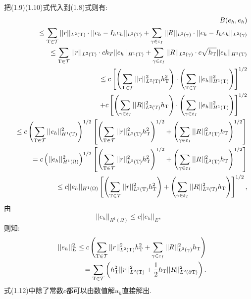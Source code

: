 \documentclass[9pt, a4paper,eqno]{article}
\theoremstyle{plain}
\begin{document}
\begin{CJK}{UTF8}{gkai}
把(1.9)(1.10)式代入到(1.8)式则有:
\begin{eqnarray}
&& B(e_{h},e_{h})
\nonumber\\&& \leq \sum_{ \rm T \in \mathcal{T} } || r|| _{L^{2}(\rm T)} \cdot || e_{h} - I_{h}e_{h} || _{L^{2}(\rm T)} + \sum_{ \gamma \in \varepsilon_{I} } || R|| _{L^{2}(\gamma)} \cdot || e_{h} - I_{h}e_{h} || _{L^{2}(\gamma)}
\nonumber\\&& \leq \sum_{\rm T \in \mathcal{T} } ||r||_{L^{2}(\rm T)} \cdot ch_{T} ||e_{h}||_{H^{1}(\rm T)}+ \sum_{\gamma \in \varepsilon_{I}} ||R||_{L^{2}(\gamma)} \cdot c \sqrt{h_{\rm T}} ||e_{h}||_{H^{1}(\rm T)}
\nonumber\\&& \leq c\left[ \left(\sum _{\rm T \in \mathcal{T}}||r||_{L^{2}(\rm T)}^{2} h_{\rm T}^{2}\right ) \cdot \left(\sum _{\rm T \in \mathcal{T}}||e_{h}||_{H^{1}(\rm T)}^{2}\right )  \right]^{1/2} 
\nonumber\\&& \hspace*{0.5cm}+ c \left[ \left (\sum _{\gamma \in \varepsilon_{I}}||R||_{L^{2}(\rm T)}^{2} h_{\rm T}\right ) \cdot \left (\sum _{\gamma \in \varepsilon_{I}}||e_{h}||_{H^{1}(\rm T)}^{2}\right )  \right]^{1/2}
\nonumber\\&& \leq c \left (\sum _{\rm T \in \mathcal{T}} ||e_{h}||_{H^{1}(\rm T)}^{2}\right )^{1/2} \left[ \left(\sum _{\rm T \in \mathcal{T}}||r||_{L^{2}(\rm T)}^{2}h_{\rm T}^{2}\right)^{1/2} +\left (\sum _{\gamma \in \varepsilon_{I}}||R||_{L^{2}(\rm T)}^{2} h_{\rm T}\right )^{1/2}  \right]
\nonumber\\&& = c \left ( ||e_{h}||_{H^{1}(\Omega)}^{2}\right )^{1/2} \left[ \left(\sum _{\rm T \in \mathcal{T}}||r||_{L^{2}(\rm T)}^{2}h_{\rm T}^{2}\right)^{1/2} +\left (\sum _{\gamma \in \varepsilon_{I}}||R||_{L^{2}(\rm T)}^{2} h_{\rm T}\right )^{1/2}  \right]
\nonumber\\&& \leq c  ||e_{h}||_{H^{1}(\Omega)}\left[ \left(\sum _{\rm T \in \mathcal{T}}||r||_{L^{2}(\rm T)}^{2}h_{\rm T}^{2}\right) +\left (\sum _{\gamma \in \varepsilon_{I}}||R||_{L^{2}(\rm T)}^{2} h_{\rm T}\right )  \right]^{1/2},
\label{A1anotherboun}
\end{eqnarray}
由 $$||e_h||_{H^{1}(\Omega)} \leq c||e_{h}||_{E},$$
则知:
\begin{eqnarray}
&& ||e_{h}||_{E}^{2} \leq c \left( \sum _{\rm T \in \mathcal{T}} ||r||_{L^{2}(\rm T)}^{2} h_{\rm T}^{2} + \sum _{\gamma \in \varepsilon _{I}} ||R||_{L^{2}(\gamma)}^{2}h_{\rm T} \right)
\nonumber\\&& =\sum _{\rm T \in \mathcal{T}}\left( h_{\rm T }^{2} ||r||_{L^{2}(\rm T)}^{2} + \dfrac{1}{2} h_{\rm T} ||R||_{L^{2}(\partial \rm T)}^{2}      \right).
\end{eqnarray}
式(1.12)中除了常数$c$都可以由数值解$u_{h}$直接解出.


\end{CJK}
\end{document}
